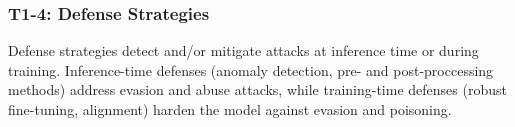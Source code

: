 



\subsubsection{T1-4: Defense Strategies} \label{sec:t1_4}
Defense strategies detect and/or mitigate attacks at inference time or during training. Inference-time defenses (\eg anomaly detection, pre- and post-proccessing methods) address evasion and abuse attacks, while training-time defenses (robust fine-tuning, alignment) harden the model against evasion and poisoning.%


